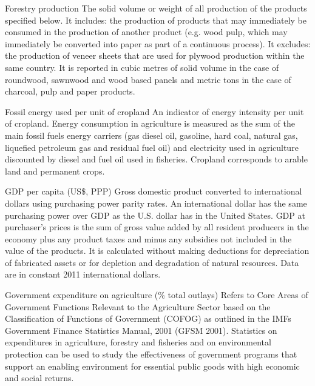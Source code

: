\begin{MetadataCollection} {}
\begin{Energy consumption in agriculture, total} {}
\begin{metadata}{Forestry production} {}
The solid volume or weight of all production of the products specified below. It includes: the production of products that may immediately be consumed in the production of another product (e.g. wood pulp, which may immediately be converted into paper as part of a continuous process). It excludes: the production of veneer sheets that are used for plywood production within the same country. It is reported in cubic metres of solid volume in the case of roundwood, sawnwood and wood based panels and metric tons in the case of charcoal, pulp and paper products.
\end{metadata}

\begin{metadata}{Fossil energy used per unit of cropland} {}
An indicator of energy intensity per unit of cropland. Energy consumption in agriculture is measured as the sum of the main fossil fuels energy carriers (gas diesel oil, gasoline, hard coal, natural gas, liquefied petroleum gas and residual fuel oil) and electricity used in agriculture discounted by diesel and fuel oil used in fisheries. Cropland corresponds to arable land and permanent crops.
\end{metadata}

\begin{metadata}{GDP per capita (US\$, PPP)} {}
Gross domestic product converted to international dollars using purchasing power parity rates. An international dollar has the same purchasing power over GDP as the U.S. dollar has in the United States. GDP at purchaser's prices is the sum of gross value added by all resident producers in the economy plus any product taxes and minus any subsidies not included in the value of the products. It is calculated without making deductions for depreciation of fabricated assets or for depletion and degradation of natural resources. Data are in constant 2011 international dollars.
\end{metadata}

\begin{metadata}{Government expenditure on agriculture (\% total outlays)} {}
Refers to Core Areas of Government Functions Relevant to the Agriculture Sector based on the Classification of Functions of Government (COFOG) as outlined in the IMFs Government Finance Statistics Manual, 2001 (GFSM 2001). Statistics on expenditures in agriculture, forestry and fisheries and on environmental protection can be used to study the effectiveness of government programs that support an enabling environment for essential public goods with high economic and social returns. 
\end{metadata}


\end{Energy consumption in agriculture, total}
\end{MetadataCollection}
